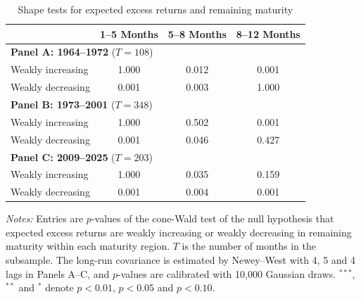 \begin{table}[!htbp]
\centering
\caption{Shape tests for expected excess returns and remaining maturity}
\label{tab:e3_shape_tests}
\begin{tabular}{lccc}
\toprule
 & 1--5 Months & 5--8 Months & 8--12 Months \\
\midrule
\multicolumn{4}{l}{\textbf{Panel A: 1964--1972} ($T = 108$)} \\
\quad Weakly increasing & 1.000 & 0.012\rlap{$^{**}$} & \llap{$<$\,}0.001\rlap{$^{***}$} \\
\quad Weakly decreasing & \llap{$<$\,}0.001\rlap{$^{***}$} & 0.003\rlap{$^{***}$} & 1.000 \\
\midrule
\multicolumn{4}{l}{\textbf{Panel B: 1973--2001} ($T = 348$)} \\
\quad Weakly increasing & 1.000 & 0.502 & \llap{$<$\,}0.001\rlap{$^{***}$} \\
\quad Weakly decreasing & \llap{$<$\,}0.001\rlap{$^{***}$} & 0.046\rlap{$^{**}$} & 0.427 \\
\midrule
\multicolumn{4}{l}{\textbf{Panel C: 2009--2025} ($T = 203$)} \\
\quad Weakly increasing & 1.000 & 0.035\rlap{$^{**}$} & 0.159 \\
\quad Weakly decreasing & \llap{$<$\,}0.001\rlap{$^{***}$} & 0.004\rlap{$^{***}$} & \llap{$<$\,}0.001\rlap{$^{***}$} \\
\bottomrule
\end{tabular}
\par\medskip
\begin{minipage}{\linewidth}
\footnotesize\textit{Notes:} Entries are $p$-values of the cone-Wald test of the null hypothesis that expected excess returns are weakly increasing or weakly decreasing in remaining maturity within each maturity region. $T$ is the number of months in the subsample. The long-run covariance is estimated by Newey--West with 4, 5 and 4 lags in Panels A--C, and $p$-values are calibrated with 10,000 Gaussian draws. $^{***}$, $^{**}$ and $^{*}$ denote $p < 0.01$, $p < 0.05$ and $p < 0.10$.
\end{minipage}
\end{table}
